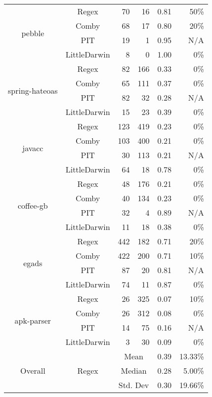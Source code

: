 \documentclass[sigconf,review, anonymous]{acmart}
\begin{document}
{\begin{table}[htbp]
{\begin{tabular}{|c|c|r|r|r|r|}
 \multirow{4}{*}{\small pebble} & Regex & 70 & 16 & 0.81 & 50\% \\\cline{2-6}
    & Comby & 68 & 17 & 0.80 & 20\% \\\cline{2-6}
    & PIT & 19 & 1 & 0.95 & N/A \\ \cline{2-6}
    & LittleDarwin & 8 & 0 & 1.00 & 0\% \\ \hline
\multirow{4}{*}{\small spring-hateoas} & Regex & 82 & 166 & 0.33 & 0\% \\\cline{2-6}
    & Comby & 65 & 111 & 0.37 & 0\% \\ \cline{2-6}
    & PIT & 82 & 32 & 0.28 & N/A \\ \cline{2-6}
    & LittleDarwin & 15 & 23 & 0.39 & 0\% \\ \hline
\multirow{4}{*}{\small javacc} & Regex & 123 & 419 & 0.23 & 0\% \\\cline{2-6}
    & Comby & 103 & 400 & 0.21 & 0\% \\ \cline{2-6}
    & PIT & 30 & 113 & 0.21 & N/A\\ \cline{2-6}
    & LittleDarwin & 64 & 18 & 0.78 & 0\%\\ \hline
\multirow{4}{*}{\small coffee-gb} & Regex & 48 & 176 & 0.21 & 0\%\\\cline{2-6}
    & Comby & 40 & 134 & 0.23 & 0\% \\ \cline{2-6}
    & PIT & 32 & 4 & 0.89 & N/A \\ \cline{2-6}
    & LittleDarwin & 11 & 18 & 0.38 & 0\%\\ \hline
\multirow{4}{*}{\small egads} & Regex & 442 & 182 & 0.71 & 20\% \\\cline{2-6}
    & Comby & 422 & 200 & 0.71 & 10\% \\ \cline{2-6}
    & PIT & 87 & 20 & 0.81 & N/A \\ \cline{2-6}
    & LittleDarwin & 74 & 11 & 0.87 & 0\% \\ \hline
\multirow{4}{*}{\small apk-parser} & Regex & 26 & 325 & 0.07 & 10\%\\\cline{2-6}
    & Comby & 26 & 312 & 0.08 & 0\%\\ \cline{2-6}
    & PIT & 14 & 75  & 0.16 & N/A\\ \cline{2-6}
    & LittleDarwin & 3 & 30 & 0.09 & 0\%\\ \hline
    
\multirow{12}{*}{Overall} & \multirow{3}{*}{Regex} & \multicolumn{2}{c|}{Mean} & 0.39  & 13.33\%\\\cline{3-6}
    &   &  \multicolumn{2}{c|}{Median} & 0.28 & 5.00\% \\\cline{3-6}
    &   &  \multicolumn{2}{c|}{Std. Dev} & 0.30 & 19.66\% \\\cline{2-6}


\end{tabular}}
\end{table}}
\end{document}
